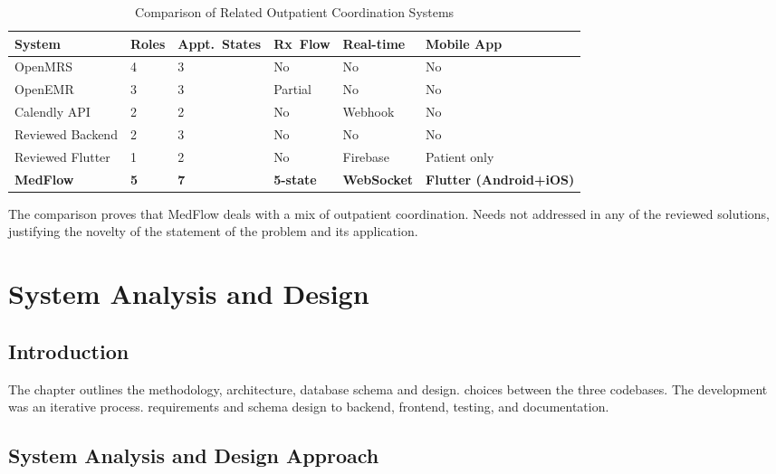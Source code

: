 \documentclass[12pt,a4paper]{report}
\begin{document}
\begin{table}[tbp]
\caption{Comparison of Related Outpatient Coordination Systems}
\label{tab:comparison}
\centering
\begin{tabular}{|p{2.8cm}|p{1.5cm}|p{1.5cm}|p{1.5cm}|p{1.6cm}|p{1.8cm}|}
\hline
\textbf{System} & \textbf{Roles} & \textbf{Appt.\ States} & \textbf{Rx\ Flow} & \textbf{Real-time} & \textbf{Mobile App}\\
\hline
OpenMRS              & 4 & 3 & No      & No       & No\\
\hline
OpenEMR              & 3 & 3 & Partial & No       & No\\
\hline
Calendly API         & 2 & 2 & No      & Webhook  & No\\
\hline
Reviewed Backend     & 2 & 3 & No      & No       & No\\
\hline
Reviewed Flutter     & 1 & 2 & No      & Firebase & Patient only\\
\hline
\textbf{MedFlow}     & \textbf{5} & \textbf{7} & \textbf{5-state} & \textbf{WebSocket} & \textbf{Flutter (Android+iOS)}\\
\hline
\end{tabular}
\end{table}

The comparison proves that MedFlow deals with a mix of outpatient coordination.
Needs not addressed in any of the reviewed solutions, justifying the novelty of
the statement of the problem and its application.

\chapter{System Analysis and Design}
\label{chap:system-analysis-and-design}

\section{Introduction}

The chapter outlines the methodology, architecture, database schema and design.
choices between the three codebases. The development was an iterative process.
requirements and schema design to backend, frontend, testing, and documentation.

\section{System Analysis and Design Approach}
\end{document}
